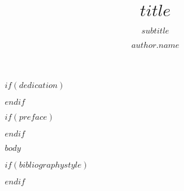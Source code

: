 \documentclass[openany,ngerman]{book}
\author{$author.name$}
\title{$title$}
\subtitle{$subtitle$}
\begin{document}
\frontmatter
\maketitle

$if(dedication)$
\dedication{$dedication$}
$endif$

$if(preface)$

$endif$

$body$

%

\backmatter

$if(bibliographystyle)$

$endif$

\end{document}
